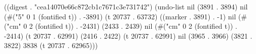 
((digest . "cea14070e66c872cb1c7671c3e731742") (undo-list nil (3891 . 3894) nil (#("5" 0 1 (fontified t)) . -3891) (t 20737 . 63732) ((marker . 3891) . -1) nil (#("cm" 0 2 (fontified t)) . -2431) (2433 . 2439) nil (#("cm" 0 2 (fontified t)) . -2414) (t 20737 . 62991) (2416 . 2422) (t 20737 . 62991) nil (3965 . 3966) (3821 . 3822) 3838 (t 20737 . 62965)))
